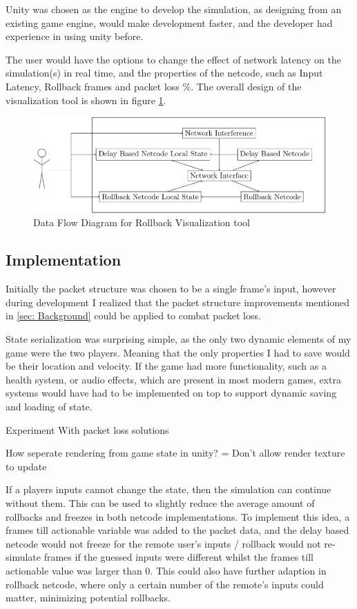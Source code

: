 \documentclass{entcs}
\begin{document}
Unity was chosen as the engine to develop the simulation, as designing from an existing game engine, would make development faster, and the developer had experience in using unity before.

The user would have the options to change the effect of network latency on the simulation(s) in real time, and the properties of the netcode, such as Input Latency, Rollback frames and packet loss \%. 
The overall design of the visualization tool is shown in figure \ref{fig:DFD}.

\begin{figure}[h]
\centering
\includegraphics[width=\textwidth]{UIDesign}
\caption{Data Flow Diagram for Rollback Visualization tool}
\label{fig:DFD}
\end{figure}

\subsection{Implementation}

Initially the packet structure was chosen to be a single frame's input, however during development I realized that the packet structure improvements mentioned in \ref{sec: Background} could be applied to combat packet loss.

State serialization was surprising simple, as the only two dynamic elements of my game were the two players. Meaning that the only properties I had to save would be their location and velocity. If the game had more functionality, such as a health system, or audio effects, which are present in most modern games, extra systems would have had to be implemented on top to support dynamic saving and loading of state.

Experiment With packet loss solutions


How seperate rendering from game state in unity? = Don't allow render texture to update


If a players inputs cannot change the state, then the simulation can continue without them. This can be used to slightly reduce the average amount of rollbacks and freezes in both netcode implementations. To implement this idea, a frames till actionable variable was added to the packet data, and the delay based netcode would not freeze for the remote user's inputs / rollback would not re-simulate frames if the guessed inputs were different whilst the frames till actionable value was larger than 0. This could also have further adaption in rollback netcode, where only a certain number of the remote's inputs could matter, minimizing potential rollbacks.
\end{document}
